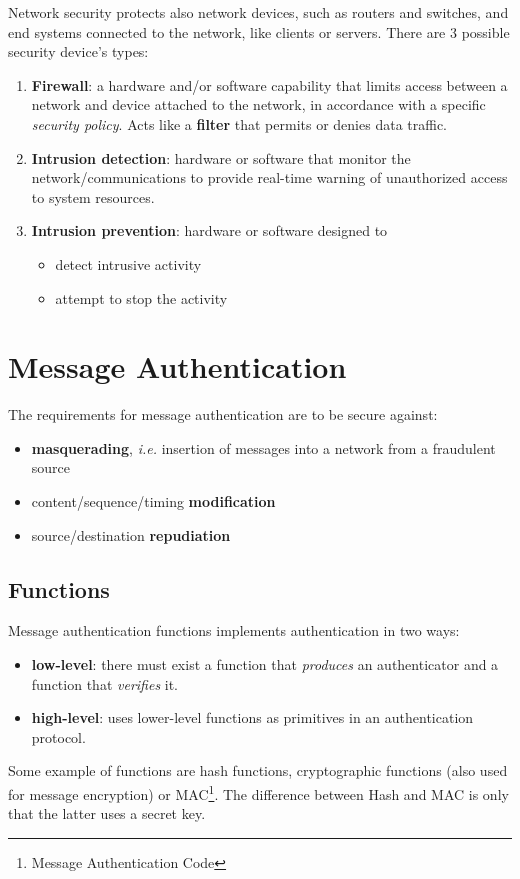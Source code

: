 \documentclass[oneside]{academica}
\begin{document}
Network security protects also network devices, such as routers and switches, and end systems connected to the network, like clients or servers.
There are 3 possible security device's types:
\begin{enumerate}
  \item \textbf{Firewall}: a hardware and/or software capability that limits access between a network and device attached to the network, in accordance with a specific \textit{security policy}. Acts like a \textbf{filter} that permits or denies data traffic.
  \item \textbf{Intrusion detection}: hardware or software that monitor the network/communications to provide real-time warning of unauthorized access to system resources.
  \item \textbf{Intrusion prevention}: hardware or software designed to
    \begin{itemize}
      \item detect intrusive activity
      \item attempt to stop the activity
    \end{itemize}
\end{enumerate}

\chapter{Message Authentication}

The requirements for message authentication are to be secure against:
\begin{itemize}
  \item \textbf{masquerading}, \textit{i.e.} insertion of messages into a network from a fraudulent source
  \item content/sequence/timing \textbf{modification}
  \item source/destination \textbf{repudiation}
\end{itemize}

\section{Functions}

Message authentication functions implements authentication in two ways:
\begin{itemize}
  \item \textbf{low-level}: there must exist a function that \textit{produces} an authenticator and a function that \textit{verifies} it.
  \item \textbf{high-level}: uses lower-level functions as primitives in an authentication protocol.
\end{itemize}
Some example of functions are hash functions, cryptographic functions (also used for message encryption) or MAC\footnote{Message Authentication Code}.
The difference between Hash and MAC is only that the latter uses a secret key.
\end{document}
